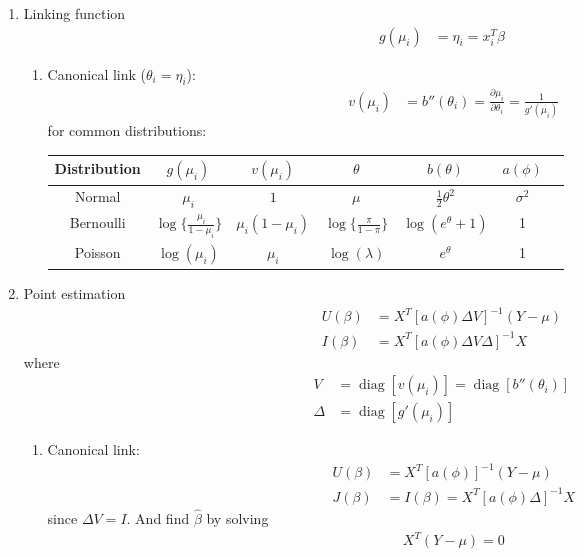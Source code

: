 \documentclass{amsart}
\begin{document}
\begin{enumerate}
\begin{enumerate}
  \end{enumerate}
\item Linking function
  \begin{align*}
    g(\mu_i) & = \eta_i = x_i^T \beta 
  \end{align*}
  \begin{enumerate}
  \item Canonical link ($\theta_i = \eta_i$):
    \begin{align*}
      v(\mu_i) & = b''(\theta_i) = \frac{\partial\mu_i}{\partial\theta_i} = \frac{1}{g'(\mu_i)}
    \end{align*}
    for common distributions: \bigskip
    \begin{center}
      \begin{tabular}{|c|c|c|c|c|c|c|}
        \hline
        Distribution & $g(\mu_i)$ & $v(\mu_i)$ & $\theta$ & $b(\theta)$ & $a(\phi)$ \\
        \hline
        Normal & $\mu_i$ & $1$ & $\mu$ & $ \frac{1}{2} \theta^2 $ & $\sigma^2$ \\
        \hline
        Bernoulli & $\log\{\frac{\mu_i}{1-\mu_i}\}$ & $\mu_i(1-\mu_i)$ & $\log\{\frac{\pi}{1-\pi}\}$ & $\log(e^\theta+1)$ & 1 \\
        \hline
        Poisson & $\log(\mu_i)$ & $\mu_i$ & $\log(\lambda)$ & $e^\theta$ & 1 \\
        \hline
      \end{tabular}
    \end{center}
  \end{enumerate}

\item Point estimation
  \begin{align*}
    U(\beta) & = X^T [a(\phi) \Delta V]^{-1} (Y - \mu) \\
    I(\beta) & = X^T [a(\phi) \Delta V \Delta]^{-1} X 
  \end{align*}
  where
  \begin{align*}
    V & = \operatorname{diag}[v(\mu_i)] = \operatorname{diag}[b''(\theta_i)] \\
    \Delta & = \operatorname{diag} [g'(\mu_i)]
  \end{align*}
  \begin{enumerate}
  \item Canonical link:
    \begin{align*}
      U(\beta) & = X^T [a(\phi)]^{-1} (Y - \mu) \\
      J(\beta) & = I(\beta) = X^T [a(\phi) \Delta]^{-1} X 
    \end{align*}
    since $\Delta V = I$. And find $\hat{\beta}$ by solving
    \begin{align*}
      X^T(Y - \mu) = 0
    \end{align*}
  \end{enumerate}
  

\end{enumerate}
\end{document}
